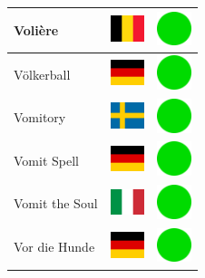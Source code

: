 \documentclass[12pt, a4paper, twoside]{report}
\begin{document}
\begin{center}
\begin{longtable}{|p{5cm}|p{2cm}|p{2cm}|}
 Volière                                                    & \includegraphics[width=1cm]{../img/flags/be} &   \includegraphics[width=1cm]{../likes/y} \\ \hline
 Völkerball                                                 & \includegraphics[width=1cm]{../img/flags/de} &   \includegraphics[width=1cm]{../likes/y} \\ \hline
 Vomitory                                                   & \includegraphics[width=1cm]{../img/flags/se} &   \includegraphics[width=1cm]{../likes/y} \\ \hline
 Vomit Spell                                                & \includegraphics[width=1cm]{../img/flags/de} &   \includegraphics[width=1cm]{../likes/y} \\ \hline
 Vomit the Soul                                             & \includegraphics[width=1cm]{../img/flags/it} &   \includegraphics[width=1cm]{../likes/y} \\ \hline
 Vor die Hunde                                              & \includegraphics[width=1cm]{../img/flags/de} &   \includegraphics[width=1cm]{../likes/y} \\ \hline

\end{longtable}
\end{center}
\end{document}

